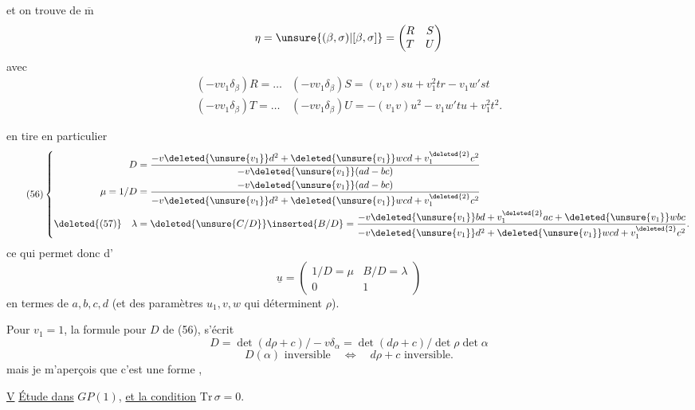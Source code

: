 
et on trouve de $\overline{\mathrm m}$
\[
\eta=\unsure{(\beta,\sigma)|[\beta,\sigma]}=
\begin{pmatrix}R&S\\T&U\end{pmatrix}
\]
avec
\[
\tag{55}
\begin{array}{ll}
(-vv_1\delta_\beta)R=\ldots
&(-vv_1\delta_\beta)S
 =(v_1v)su+v_1^{2}tr-v_1w'st\\
(-vv_1\delta_\beta)T=\ldots
&(-vv_1\delta_\beta)U
 =-(v_1v)u^2-v_1w'tu+v_1^{2}t^2.
\end{array}
\]

 en tire en particulier
\[
\tag{56}
\left\{
\begin{aligned}
D&=\frac{-v\deleted{\unsure{v_1}}d^2+
\deleted{\unsure{v_1}}wcd+v_1^{\deleted{2}}c^2}
{-v\deleted{\unsure{v_1}}(ad-bc)}\\
\mu=1/D&=\frac{-v\deleted{\unsure{v_1}}(ad-bc)}
{-v\deleted{\unsure{v_1}}d^2+
\deleted{\unsure{v_1}}wcd+v_1^{\deleted{2}}c^2}\\
\deleted{(57)}\quad\lambda&=\deleted{\unsure{C/D}}\inserted{B/D}
=\frac{-v\deleted{\unsure{v_1}}bd+v_1^{\deleted{2}}ac+
\deleted{\unsure{v_1}}wbc}
{-v\deleted{\unsure{v_1}}d^2+
\deleted{\unsure{v_1}}wcd+v_1^{\deleted{2}}c^2}.
\end{aligned}
\right.
\]
ce qui permet donc d'
\[
\underline{u}=\begin{pmatrix}1/D=\mu&B/D=\lambda\\0&1\end{pmatrix}
\]
en termes de $a,b,c,d$ (et des paramètres $u_1,v,w$
qui déterminent $\rho$).

Pour \uline{$v_1=1$}, la formule pour $D$ de (56), s'écrit
\[
\tag{57}
D=\det(d\rho+c)/-v\delta_\alpha
=\det(d\rho+c)/\det\rho\det\alpha
\]
\[
\tag{58}
D(\alpha)\text{ inversible}\quad\Longleftrightarrow\quad
d\rho+c\text{ inversible}.
\]
mais je m'aperçois que c'est une forme ,


\uline{V}\qquad
\uline{Étude}\uline{ dans}
$GP(1)$, \uline{et la condition} $\mathrm{Tr}\,\sigma=0$.

